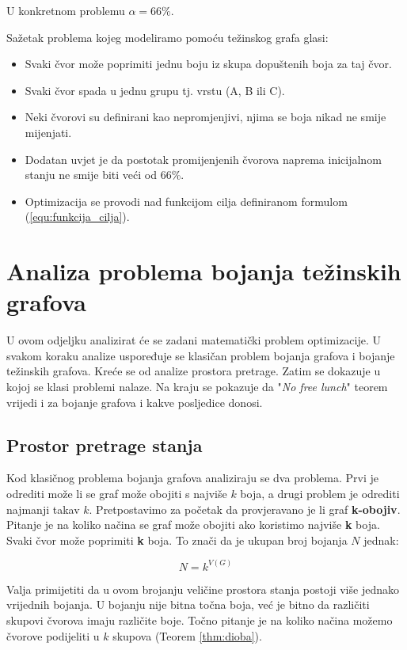 \documentclass[times, utf8, diplomski, numeric]{fer}
\begin{document}
U konkretnom problemu $\alpha=66\%$.

Sažetak problema kojeg modeliramo pomoću težinskog grafa glasi:
\begin{itemize}
	\item Svaki čvor može poprimiti jednu boju iz skupa dopuštenih boja za taj čvor.
	\item Svaki čvor spada u jednu grupu tj. vrstu (A, B ili C).
	\item Neki čvorovi su definirani kao nepromjenjivi, njima se boja nikad ne smije mijenjati.
	\item Dodatan uvjet je da postotak promijenjenih čvorova naprema inicijalnom stanju ne smije biti veći od 66\%.
	\item Optimizacija se provodi nad funkcijom cilja definiranom formulom (\ref{equ:funkcija_cilja}).
\end{itemize}

\section{Analiza problema bojanja težinskih grafova}

U ovom odjeljku analizirat će se zadani matematički problem optimizacije. U svakom koraku analize uspoređuje se klasičan problem bojanja grafova i bojanje težinskih grafova. Kreće se od analize prostora pretrage. Zatim se dokazuje u kojoj se klasi problemi nalaze. Na kraju se pokazuje da "\emph{No free lunch}" teorem vrijedi i za bojanje grafova i kakve posljedice donosi.

\subsection{Prostor pretrage stanja}

Kod klasičnog problema bojanja grafova analiziraju se dva problema. Prvi je odrediti može li se graf može obojiti s najviše $k$ boja, a drugi problem je odrediti najmanji takav $k$. Pretpostavimo za početak da provjeravano je li graf \textbf{k-obojiv}. Pitanje je na koliko načina se graf može obojiti ako koristimo najviše \textbf{k} boja. Svaki čvor može poprimiti \textbf{k} boja. To znači da je ukupan broj bojanja $N$ jednak: 

\begin{equation}
N = k^{V(G)} 
\end{equation}

Valja primijetiti da u ovom brojanju veličine prostora stanja postoji više jednako vrijednih bojanja. U bojanju nije bitna točna boja, već je bitno da različiti skupovi čvorova imaju različite boje. Točno pitanje je na koliko načina možemo čvorove podijeliti u $k$ skupova (Teorem \ref{thm:dioba}).  
\end{document}
